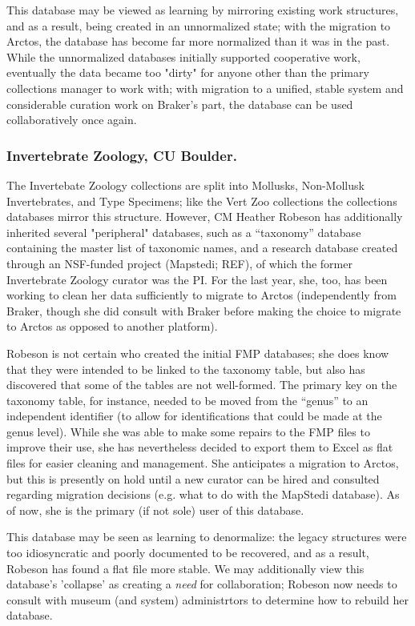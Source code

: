 This database may be viewed as learning by mirroring existing work structures, and as a result, being created in an unnormalized state; with the migration to Arctos, the database has become far more normalized than it was in the past. While the unnormalized databases initially supported cooperative work, eventually the data became too "dirty" for anyone other than the primary collections manager to work with; with migration to a unified, stable system and considerable curation work on Braker's part, the database can be used collaboratively once again.

\subsubsection{Invertebrate Zoology, CU Boulder.}

The Invertebate Zoology collections are split into Mollusks, Non-Mollusk Invertebrates, and Type Specimens; like the Vert Zoo collections the collections databases mirror this structure.  However, CM Heather Robeson has additionally inherited several "peripheral" databases, such as a “taxonomy” database containing the master list of taxonomic names, and a research database created through an NSF-funded project (Mapstedi; REF), of which the former Invertebrate Zoology curator was the PI. For the last year, she, too, has been working to clean her data sufficiently to migrate to Arctos (independently from Braker, though she did consult with Braker before making the choice to migrate to Arctos as opposed to another platform). 

Robeson is not certain who created the initial FMP databases; she does know that they were intended to be linked to the taxonomy table, but also has discovered that some of the tables are not well-formed. The primary key on the taxonomy table, for instance, needed to be moved from the “genus” to an independent identifier (to allow for identifications that could be made at the genus level). While she was able to make some repairs to the FMP files to improve their use, she has nevertheless decided to export them to Excel as flat files for easier cleaning and management.  She anticipates a migration to Arctos, but this is presently on hold until a new curator can be hired and consulted regarding migration decisions (e.g. what to do with the MapStedi database).  As of now, she is the primary (if not sole) user of this database.

This database may be seen as learning to denormalize: the legacy structures were too idiosyncratic and poorly documented to be recovered, and as a result, Robeson has found a flat file more stable. We may additionally view this database's 'collapse' as creating a \textit{need} for collaboration; Robeson now needs to consult with museum (and system) administrtors to determine how to rebuild her database.

